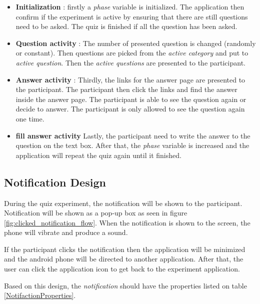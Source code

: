 \begin{itemize}
\item \textbf{Initialization} : firstly a \textit{phase} variable is initialized. The application then confirm if the experiment is active by ensuring that there are still questions need to be asked. The quiz is finished if all the question has been asked.
\item \textbf{Question activity} :  The number of presented question is changed (randomly or constant).
Then questions are picked from the \textit{active category} and put to \textit{active question}. Then the \textit{active questions} are presented to the participant.
\item \textbf{Answer activity} : Thirdly, the links for the answer page are presented to the participant. The participant then click the links and find the answer inside the answer page.
The participant is able to see the question again or decide to answer. The participant is only allowed to see the question again one time.
\item \textbf{fill answer activity} Lastly, the participant need to write the answer to the question on the text box.
After that, the \textit{phase} variable is increased and the application will repeat the quiz again until it finished.
\end{itemize}


\subsection{Notification Design}

During the quiz experiment, the notification will be shown to the participant.
Notification will be shown as a pop-up box as seen in figure \ref{fig:clicked_notification_flow}.
When the notification is shown to the screen, the phone will vibrate and produce a sound.

 If the participant clicks the notification then the application will be minimized and the android phone will be directed to another application.
 After that, the user can click the application icon to get back to the experiment application.

Based on this design, the \textit{notification} should have the properties listed on table \ref{NotifactionProperties}.

